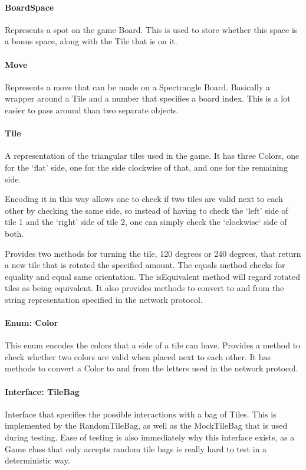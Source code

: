 \documentclass[12pt, letterpaper]{article}
\begin{document}
    \paragraph{BoardSpace}
    Represents a spot on the game Board.
    This is used to store whether this space is a bonus space, along with the Tile that is on it.

    \paragraph{Move}
    Represents a move that can be made on a Spectrangle Board.
    Basically a wrapper around a Tile and a number that specifies a board index.
    This is a lot easier to pass around than two separate objects.

    \paragraph{Tile}
    A representation of the triangular tiles used in the game.
    It has three Colors, one for the `flat' side, one for the side clockwise of that, and one for the remaining side.

    Encoding it in this way allows one to check if two tiles are valid next to each other by checking the same side,
    so instead of having to check the `left' side of tile 1 and the `right' side of tile 2, one can simply check
    the `clockwise` side of both.

    Provides two methods for turning the tile, 120 degrees or 240 degrees, that return a new tile that is rotated
    the specified amount.
    The equals method checks for equality and equal same orientation.
    The isEquivalent method will regard rotated tiles as being equivalent.
    It also provides methods to convert to and from the string representation specified in the network protocol.

    \paragraph{Enum: Color}
    This enum encodes the colors that a side of a tile can have.
    Provides a method to check whether two colors are valid when placed next to each other.
    It has methods to convert a Color to and from the letters used in the network protocol.

    \paragraph{Interface: TileBag}
    Interface that specifies the possible interactions with a bag of Tiles.
    This is implemented by the RandomTileBag, as well as the MockTileBag that is used during testing.
    Ease of testing is also immediately why this interface exists, as a Game class that only accepts random
    tile bags is really hard to test in a deterministic way.
\end{document}
